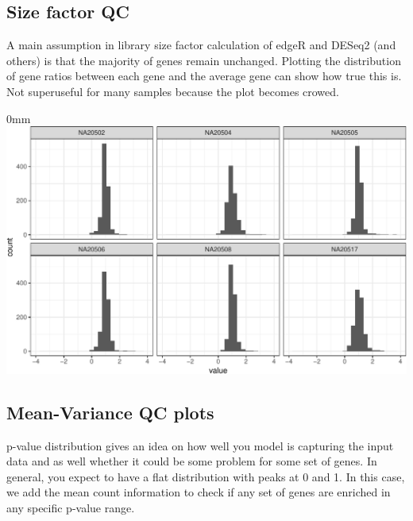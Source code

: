 \documentclass{article}
\begin{document}
\subsection{Size factor QC}

A main assumption in library size factor calculation of edgeR and DESeq2 (and others)
is that the majority of genes remain unchanged. Plotting the distribution
of gene ratios between each gene and the average gene can show how true this is.
Not superuseful for many samples because the plot becomes crowed.

\begin{knitrout}
\color{fgcolor}\begin{kframe}
\begin{alltt}
\hlstd{(counts[,} \hlopt{:}\hlstd{])}
\end{alltt}


{\ttfamily\noindent\color{warningcolor}{\#\# Warning: Removed 7 rows containing non-finite values (stat\_bin).}}\end{kframe}\begin{adjustwidth}{\fltoffset}{0mm}
\includegraphics[width=\maxwidth]{figure/chunk-size-factor-1} \end{adjustwidth}
\end{knitrout}


\subsection{Mean-Variance QC plots}

p-value distribution gives an idea on how well you model is capturing the input data
and as well whether it could be some problem for some set of genes. In general,
you expect to have a flat distribution with peaks at 0 and 1. In this case, we add
the mean count information to check if any set of genes are enriched in any
specific p-value range.
\end{document}
